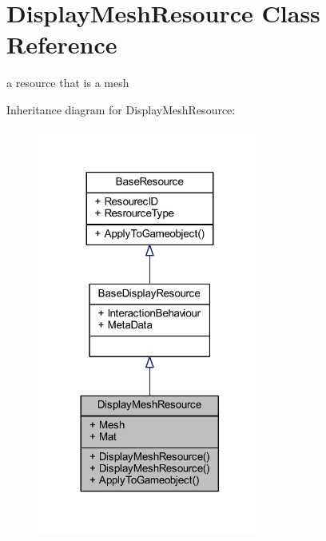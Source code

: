 \hypertarget{class_display_mesh_resource}{}\section{Display\+Mesh\+Resource Class Reference}
\label{class_display_mesh_resource}


a resource that is a mesh  




Inheritance diagram for Display\+Mesh\+Resource\+:
\nopagebreak
\begin{figure}[H]
\begin{center}
\leavevmode
\includegraphics[width=209pt]{class_display_mesh_resource__inherit__graph}
\end{center}
\end{figure}


